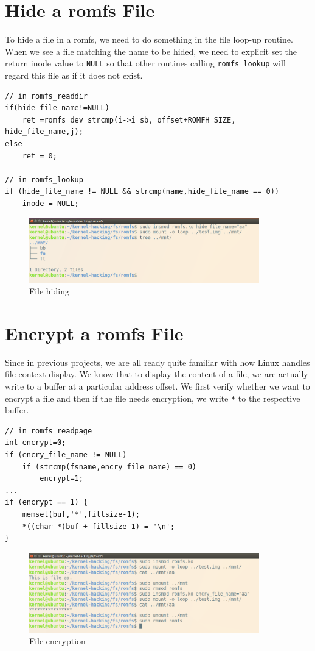 \documentclass{article}
\begin{document}
\section{Hide a romfs File}
To hide a file in a romfs, we need to do something in the file loop-up routine. When we see a file matching the name to be hided, we need to explicit set the return inode value to \verb|NULL| so that other routines calling \verb|romfs_lookup| will regard this file as if it does not exist.

\begin{lstlisting}[caption=Code for file hiding]
// in romfs_readdir
if(hide_file_name!=NULL)
    ret =romfs_dev_strcmp(i->i_sb, offset+ROMFH_SIZE, hide_file_name,j);
else
	ret = 0;

// in romfs_lookup
if (hide_file_name != NULL && strcmp(name,hide_file_name == 0))
    inode = NULL;
\end{lstlisting}

\begin{figure}[H]
\centering
\includegraphics[width=10cm]{hide.png}
\caption{File hiding}
\end{figure}


\section{Encrypt a romfs File}
Since in previous projects, we are all ready quite familiar with how Linux handles file context display. We know that to display the content of a file, we are actually write to a buffer at a particular address offset. We first verify whether we want to encrypt a file and then if the file needs encryption, we write \verb|*| to the respective buffer.

\begin{lstlisting}[caption=Code for encryption]
// in romfs_readpage
int encrypt=0;
if (encry_file_name != NULL)
	if (strcmp(fsname,encry_file_name) == 0)
		encrypt=1;
...
if (encrypt == 1) {
	memset(buf,'*',fillsize-1);
	*((char *)buf + fillsize-1) = '\n';	
}
\end{lstlisting}

\begin{figure}[H]
\centering
\includegraphics[width=10cm]{encry.png}
\caption{File encryption}
\end{figure}
\end{document}
